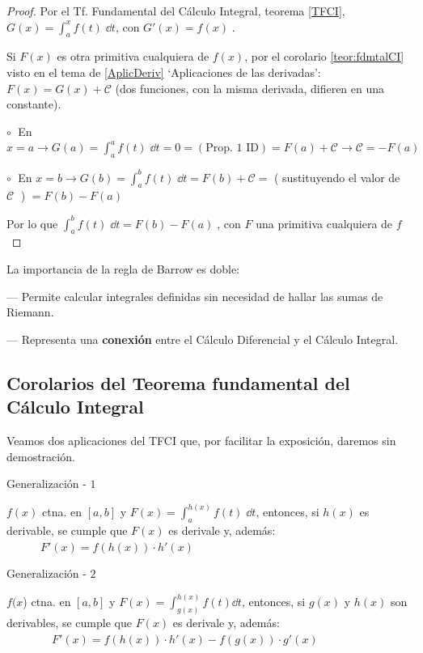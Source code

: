 \begin{proof}
	Por el Tf. Fundamental del Cálculo Integral, teorema \ref{TFCI}, $\displaystyle G(x)=\int_a^x f(t)\; \dd t$, con $G'(x)=f(x)\; $. 
	
	Si $F(x)$ es otra primitiva cualquiera de $f(x)$, por el corolario \ref{teor:fdmtalCI} visto en el tema de 	\ref{AplicDeriv} `Aplicaciones de las derivadas': $F(x)=G(x)+\mathcal C$ (dos funciones, con la misma derivada, difieren en una constante).
	
	$\circ \;$ En $\displaystyle x=a \longrightarrow G(a)=\int_a^a f(t)\; \dd t=0 = (\text {Prop. 1 ID}) = F(a)+\mathcal C \longrightarrow \mathcal C=-F(a)$
	
	$\circ \;$ En $\displaystyle x=b \longrightarrow G(b)=\int_a^b f(t) \; \dd t=F(b)+\mathcal C =$
	( \tiny{sustituyendo el valor de} $ \mathcal C\;  $ ) \normalsize {$=F(b)-F(a)$} 
	
	Por lo que $\displaystyle \int_a^b f(t)\; \dd t = F(b)-F(a)\; $, con $F$ una primitiva cualquiera de $f$ 
\end{proof}

La importancia de la regla de Barrow es doble:

--- Permite calcular integrales definidas sin necesidad de hallar las sumas de Riemann.

--- Representa una \textbf{conexión} entre el Cálculo Diferencial y el Cálculo Integral. 

\subsection{Corolarios del Teorema fundamental del Cálculo Integral}

Veamos dos aplicaciones del TFCI que, por facilitar la exposición,  daremos sin demostración.

\begin{coro} {Generalización - $1$}

$f(x)$ ctna. en $[a,b]$ y $\displaystyle F(x)=\int_a^{h(x)} f(t)\;  \dd t$, entonces, si $h(x)$ es derivable, se cumple que $F(x)$ es derivale y, además: $\quad  \qquad F'(x)=f(h(x))\cdot h'(x)$
\end{coro}

\begin{coro} {Generalización - $2$}

$f(x$) ctna. en $[a,b]$ y $\displaystyle F(x)=\int_{g(x)}^{h(x)} f(t) \dd t$, entonces, si $g(x)$ y  $h(x)$ son derivables, se cumple que $F(x)$ es derivale y, además: 
$\qquad  \qquad F'(x)=f(h(x))\cdot h'(x)- f(g(x))\cdot g'(x)$	
\end{coro}

